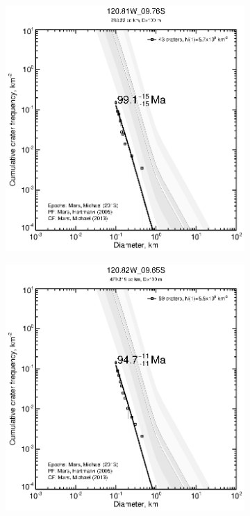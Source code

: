 \documentclass[12pt,letter]{article}
\begin{document}
\begin{figure}[h]
\begin{subfigure}{.33\textwidth}
\end{subfigure}%
\begin{subfigure}{.33\textwidth}
  \includegraphics[width=\linewidth,clip,trim=1cm 1cm 1.5cm 1cm]{figures/craterstats/120-81W_09-76S_100m_cum.eps}
\end{subfigure}
\begin{subfigure}{.33\textwidth}
  \includegraphics[width=\linewidth,clip,trim=1cm 1cm 1.5cm 1cm]{figures/craterstats/120-82W_09-65S_100m_cum.eps}

\end{subfigure}
\end{figure}
\end{document}
